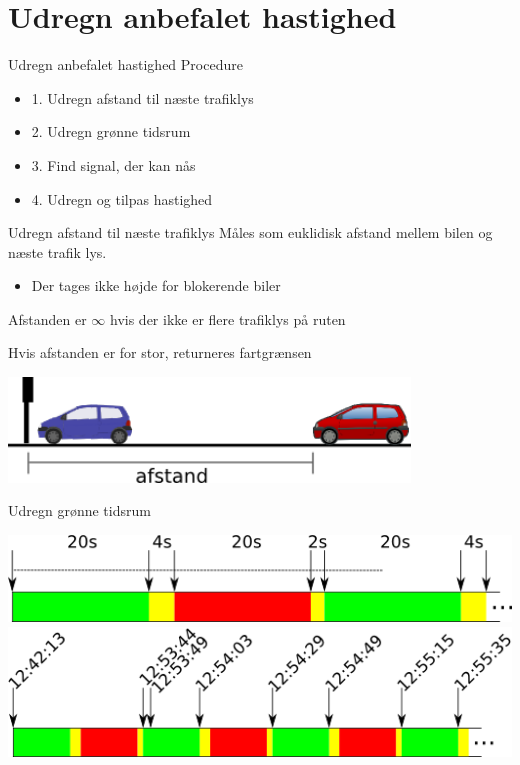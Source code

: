 \section{Udregn anbefalet hastighed}

\begin{frame}{Udregn anbefalet hastighed}
Procedure
\begin{itemize}
\item 1. Udregn afstand til næste trafiklys
\item 2. Udregn grønne tidsrum
\item 3. Find signal, der kan nås
\item 4. Udregn og tilpas hastighed
\end{itemize}
\end{frame}

\begin{frame}{Udregn afstand til næste trafiklys}
Måles som euklidisk afstand mellem bilen og næste trafik lys.
\begin{itemize}
\item Der tages ikke højde for blokerende biler
\end{itemize}

Afstanden er $\infty$ hvis der ikke er flere trafiklys på ruten

Hvis afstanden er for stor, returneres fartgrænsen

\vspace{5mm}
\begin{center}
\includegraphics[width=0.8\textwidth]{../images/algdistance.png}
\end{center}
\end{frame}

\begin{frame}{Udregn grønne tidsrum}
\begin{center}
\includegraphics[width=1\textwidth]{../images/algphases4.png}
\vspace{5mm}
\includegraphics[width=1\textwidth]{../images/algphases5.png}
\end{center}
\end{frame}

